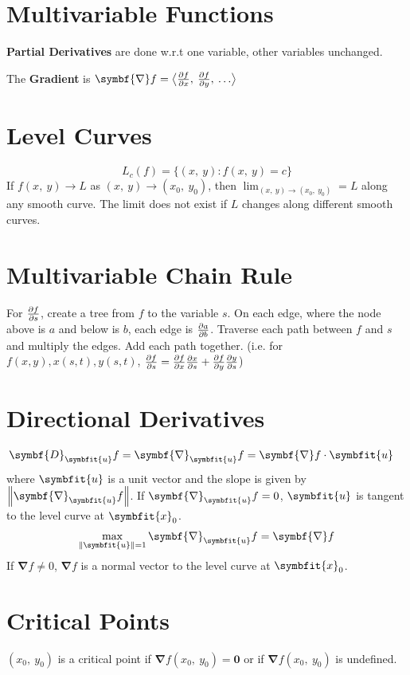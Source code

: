 \documentclass{article}
\begin{document}
\begin{multicols}{3}
    \section*{Multivariable Functions}
    \textbf{Partial Derivatives} are done w.r.t one variable, other variables unchanged.

    The \textbf{Gradient} is $\symbf{\nabla}f = \avec[\big]{\pdv{f}{x},\: \pdv{f}{y},\: \dots}$
    \section*{Level Curves}
    \begin{equation*}
        L_c\left( f \right) = \bigl\{ \left( x,\: y \right) : f\left(x,\: y\right) = c\bigr\}
    \end{equation*}
    If $f(x,\: y) \to L$ as $(x,\: y) \to (x_0,\: y_0)$, then
    $\displaystyle \lim_{(x,\: y) \to (x_0,\: y_0)} = L$ along any smooth
    curve. The limit does not exist if $L$ changes along different smooth curves.

    \section*{Multivariable Chain Rule}
    For $\pdv{f}{s}$, create a tree from $f$ to the variable $s$.
    On each edge, where the node above is $a$ and below is $b$, each edge is $\pdv{a}{b}$.
    Traverse each path between $f$ and $s$ and multiply the edges.
    Add each path together.
    (i.e. for $f(x, y), x(s,t), y(s,t)$, $\pdv{f}{s} = \pdv{f}{x}\pdv{x}{s}+\pdv{f}{y}\pdv{y}{s}$)
    \section*{Directional Derivatives}
    \begin{align*}
        \symbf{D}_{\symbfit{u}}f = \symbf{\nabla}_{\symbfit{u}}f
         & = \symbf{\nabla}f \cdot \symbfit{u}
    \end{align*}
    where $\symbfit{u}$ is a unit vector and the slope is given by $\norm{\symbf{\nabla}_{\symbfit{u}}f}$.
    If $\symbf{\nabla}_{\symbfit{u}}f=0$, $\symbfit{u}$ is tangent to the level curve at $\symbfit{x}_0$.
    \begin{align*}
        \max_{\norm{\symbfit{u}} = 1} \symbf{\nabla}_{\symbfit{u}}f = \symbf{\nabla}f
    \end{align*}
    If $\symbf{\nabla}f\neq 0$, $\symbf{\nabla}f$ is a normal vector to the level curve at $\symbfit{x}_0$.
    \section*{Critical Points}
    $(x_0,\: y_0)$ is a critical point if $\symbf{\nabla}f(x_0,\: y_0) = \symbf{0}$
    or if $\symbf{\nabla}f(x_0,\: y_0)$ is undefined.

\end{multicols}
\end{document}
